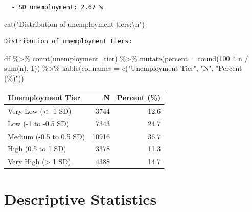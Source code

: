\documentclass[
  11pt,
]{article}
\newenvironment{Shaded}{\begin{snugshade}}{\end{snugshade}}
\newcommand{\AttributeTok}[1]{\textcolor[rgb]{0.40,0.45,0.13}{#1}}
\newcommand{\DecValTok}[1]{\textcolor[rgb]{0.68,0.00,0.00}{#1}}
\newcommand{\FunctionTok}[1]{\textcolor[rgb]{0.28,0.35,0.67}{#1}}
\newcommand{\NormalTok}[1]{\textcolor[rgb]{0.00,0.23,0.31}{#1}}
\newcommand{\SpecialCharTok}[1]{\textcolor[rgb]{0.37,0.37,0.37}{#1}}
\newcommand{\StringTok}[1]{\textcolor[rgb]{0.13,0.47,0.30}{#1}}
\begin{document}
\begin{verbatim}
  - SD unemployment: 2.67 %
\end{verbatim}

\begin{Shaded}
\begin{Highlighting}[]
\FunctionTok{cat}\NormalTok{(}\StringTok{"Distribution of unemployment tiers:}\SpecialCharTok{\textbackslash{}n}\StringTok{"}\NormalTok{)}
\end{Highlighting}
\end{Shaded}

\begin{verbatim}
Distribution of unemployment tiers:
\end{verbatim}

\begin{Shaded}
\begin{Highlighting}[]
\NormalTok{df }\SpecialCharTok{\%\textgreater{}\%}
  \FunctionTok{count}\NormalTok{(unemployment\_tier) }\SpecialCharTok{\%\textgreater{}\%}
  \FunctionTok{mutate}\NormalTok{(}\AttributeTok{percent =} \FunctionTok{round}\NormalTok{(}\DecValTok{100} \SpecialCharTok{*}\NormalTok{ n }\SpecialCharTok{/} \FunctionTok{sum}\NormalTok{(n), }\DecValTok{1}\NormalTok{)) }\SpecialCharTok{\%\textgreater{}\%}
  \FunctionTok{kable}\NormalTok{(}\AttributeTok{col.names =} \FunctionTok{c}\NormalTok{(}\StringTok{"Unemployment Tier"}\NormalTok{, }\StringTok{"N"}\NormalTok{, }\StringTok{"Percent (\%)"}\NormalTok{))}
\end{Highlighting}
\end{Shaded}

\begin{longtable}[]{@{}lrr@{}}
\toprule\noalign{}
Unemployment Tier & N & Percent (\%) \\
\midrule\noalign{}
\endhead
\bottomrule\noalign{}
\endlastfoot
Very Low (\textless{} -1 SD) & 3744 & 12.6 \\
Low (-1 to -0.5 SD) & 7343 & 24.7 \\
Medium (-0.5 to 0.5 SD) & 10916 & 36.7 \\
High (0.5 to 1 SD) & 3378 & 11.3 \\
Very High (\textgreater{} 1 SD) & 4388 & 14.7 \\
\end{longtable}

\section{Descriptive Statistics}\label{descriptive-statistics}
\end{document}

